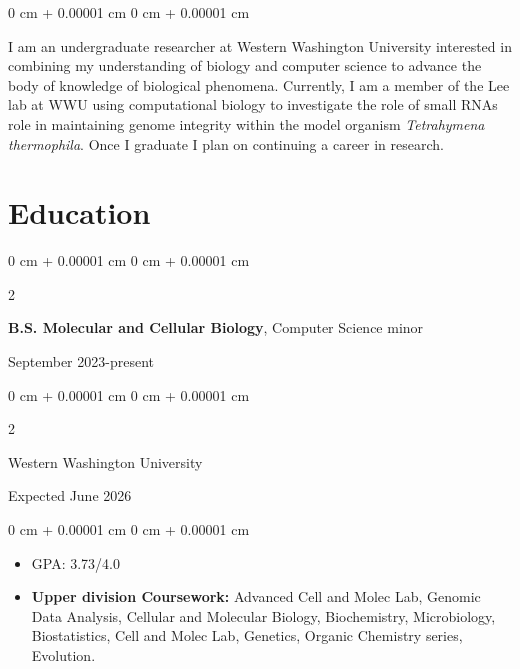 \documentclass[10pt, article]{article}
\newenvironment{highlights}{
    \begin{itemize}[
        topsep=0.10 cm,
        parsep=0.10 cm,
        partopsep=0pt,
        itemsep=0pt,
        leftmargin=0 cm + 10pt
    ]
}{
    \end{itemize}
} %
\newenvironment{onecolentry}{
    \begin{adjustwidth}{
        0 cm + 0.00001 cm
    }{
        0 cm + 0.00001 cm
    }
}{
    \end{adjustwidth}
} %
\newenvironment{twocolentry}[2][]{
    \onecolentry
    \def\secondColumn{#2}
    \setcolumnwidth{\fill, 4.5 cm}
    \begin{paracol}{2}
}{
    \switchcolumn \raggedleft \secondColumn
    \end{paracol}
    \endonecolentry
} %
\begin{document}
        \begin{onecolentry}
          I am an undergraduate researcher at Western Washington University interested in combining my understanding of biology and computer science to advance the body of knowledge of biological phenomena.
          Currently, I am a member of the Lee lab at WWU
          using computational biology to investigate the role of small RNAs role in maintaining genome integrity within the model organism \textit{Tetrahymena thermophila}. 
           Once I graduate I plan on continuing a career in research. 
        \end{onecolentry}






    \section{Education}




        \begin{twocolentry}{
            September 2023-present}
          \textbf{B.S. Molecular and Cellular Biology}, Computer Science minor 
        \end{twocolentry}
        \begin{twocolentry}{
            Expected June 2026
        }
            Western Washington University 

        \end{twocolentry}

        \vspace{0.10 cm}
        \begin{onecolentry}
            \begin{highlights}
                \item GPA: 3.73/4.0 %
                \item \textbf{Upper division Coursework:} Advanced Cell and Molec Lab, Genomic Data Analysis, Cellular and Molecular Biology, Biochemistry, Microbiology, Biostatistics, Cell and Molec Lab, Genetics, Organic Chemistry series, Evolution.
            \end{highlights}
        \end{onecolentry}
\end{document}
